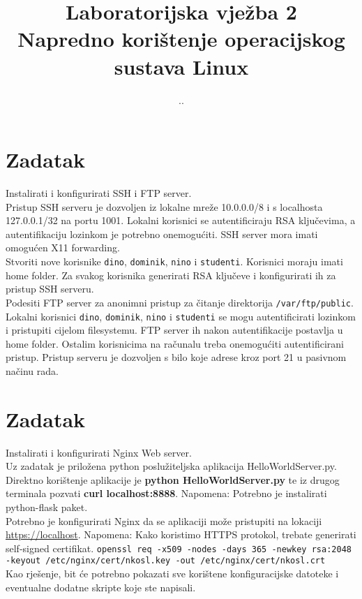 \documentclass[12pt,a4paper]{article}
\renewcommand{\dateseparator}{.}
\newcommand{\todayiso}{\twodigit\day \dateseparator \twodigit\month \dateseparator \the \year}
\begin{document}
    \title{Laboratorijska vježba 2\\{\large Napredno korištenje operacijskog sustava Linux}}
    \date{\todayiso}
	\date{\vspace{-5ex} }
	\maketitle
	

\section{Zadatak}

Instalirati i konfigurirati SSH i FTP server.\\

Pristup SSH serveru je dozvoljen iz lokalne mreže 10.0.0.0/8 i s localhosta 127.0.0.1/32 na portu 1001. Lokalni korisnici se autentificiraju RSA ključevima, a autentifikaciju lozinkom je potrebno onemogućiti. SSH server mora imati omogućen X11 forwarding.\\
Stvoriti nove korisnike \texttt{dino}, \texttt{dominik}, \texttt{nino} i \texttt{studenti}. Korisnici moraju imati home folder. Za svakog korisnika generirati RSA ključeve i konfigurirati ih za pristup SSH serveru.\\

Podesiti FTP server za anonimni pristup za čitanje direktorija \texttt{/var/ftp/public}. Lokalni korisnici \texttt{dino}, \texttt{dominik}, \texttt{nino} i \texttt{studenti} se mogu autentificirati lozinkom i pristupiti cijelom filesystemu. FTP server ih nakon autentifikacije postavlja u home folder. Ostalim korisnicima na računalu treba onemogućiti autentificirani pristup. Pristup serveru je dozvoljen s bilo koje adrese kroz port 21 u pasivnom načinu rada.\\



\section{Zadatak}

Instalirati i konfigurirati Nginx Web server. \\

Uz zadatak je priložena python poslužiteljska aplikacija HelloWorldServer.py. \\
Direktno korištenje aplikacije je \textbf{python HelloWorldServer.py} te iz drugog terminala pozvati \textbf{curl localhost:8888}.
Napomena: Potrebno je instalirati python-flask paket. \\

Potrebno je konfigurirati Nginx da se aplikaciji može pristupiti na lokaciji \url{https://localhost}. 
Napomena: Kako koristimo HTTPS protokol, trebate generirati self-signed certifikat.
\texttt{openssl req -x509 -nodes -days 365 -newkey rsa:2048 -keyout /etc/nginx/cert/nkosl.key -out /etc/nginx/cert/nkosl.crt} \\


Kao rješenje, bit će potrebno pokazati sve korištene konfiguracijske datoteke i eventualne dodatne skripte koje ste napisali.
\end{document}
